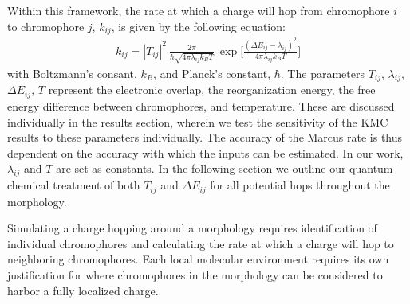 Within this framework, the rate at which a charge will hop from chromophore $i$ to chromophore $j$, $k_{ij}$,
is given by the following equation:
\begin{align}
    k_{ij}  =  |T_{ij}|^2\ \frac{2\pi}{\hbar \sqrt{4 \pi \lambda_{ij} k_{B} T}}\ \exp{\Bigg[ \frac{(\Delta
    E_{ij} - \lambda_{ij})^2}{ 4 \pi \lambda_{ij} k_{B} T} \Bigg] }
    \label{marcus}
\end{align}
with Boltzmann's consant, $k_{B}$, and Planck's constant, $\hbar$. The parameters $T_{ij}$, $\lambda_{ij}$,
$\Delta E_{ij}$, $T$ represent the electronic overlap, the reorganization energy, the free energy difference
between chromophores, and
temperature. These are discussed individually in the results section, wherein we test the sensitivity of
the KMC results to these parameters individually.
The accuracy of the Marcus rate is thus dependent on the accuracy with which the inputs can be estimated. In
our work, $\lambda_{ij}$ and $T$ are set as constants. In
the following section we outline our quantum chemical treatment of both $T_{ij}$ and $\Delta E_{ij}$ for all
potential hops throughout the morphology.

Simulating a charge hopping around a morphology requires identification of
individual chromophores and calculating the rate at which a charge will hop to neighboring
chromophores. 
Each local molecular environment requires its own justification for where chromophores in the morphology 
can be considered to harbor a fully localized charge.


